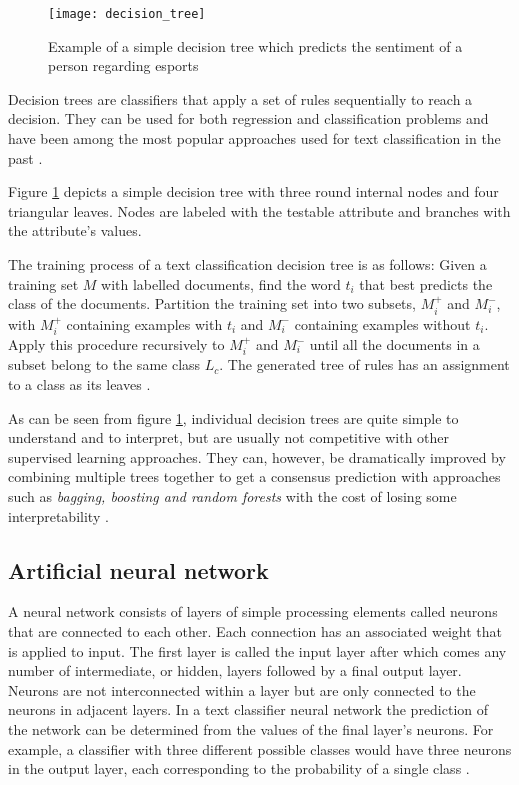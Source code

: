 \begin{figure}[t]
\texttt{[image: decision\_tree]}
\centering
\caption{Example of a simple decision tree which predicts the sentiment of a person regarding esports}
\label{fig:decision_tree}
\end{figure}
Decision trees are classifiers that apply a set of rules sequentially to reach a decision.
They can be used for both regression and classification problems and have been among the most popular approaches used for text classification in the past \cite{hotho} \cite{rokach2005}.

Figure \ref{fig:decision_tree} depicts a simple decision tree with three round internal nodes and four triangular leaves.
Nodes are labeled with the testable attribute and branches with the attribute's values.

The training process of a text classification decision tree is as follows: Given a training set $M$ with labelled documents, find the word $t_i$ that best predicts the class of the documents.
Partition the training set into two subsets, $M^+_i$ and $M^-_i$, with $M^+_i$ containing examples with $t_i$ and $M^-_i$ containing examples without $t_i$.
Apply this procedure recursively to $M^+_i$ and $M^-_i$ until all the documents in a subset belong to the same class $L_c$.
The generated tree of rules has an assignment to a class as its leaves \cite{hotho}.

As can be seen from figure \ref{fig:decision_tree}, individual decision trees are quite simple to understand and to interpret, but are usually not competitive with other supervised learning approaches.
They can, however, be dramatically improved by combining multiple trees together to get a consensus prediction with approaches such as \textit{bagging, boosting and random forests} with the cost of losing some interpretability \cite{james2013}.

\subsection{Artificial neural network} \label{Artificial neural network}

A neural network consists of layers of simple processing elements called neurons that are connected to each other.
Each connection has an associated weight that is applied to input.
The first layer is called the input layer after which comes any number of intermediate, or hidden, layers followed by a final output layer.
Neurons are not interconnected within a layer but are only connected to the neurons in adjacent layers.
In a text classifier neural network the prediction of the network can be determined from the values of the final layer's neurons.
For example, a classifier with three different possible classes would have three neurons in the output layer, each corresponding to the probability of a single class \cite{pal1992}.

